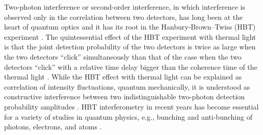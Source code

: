 \documentclass[aps,prl,reprint,showpacs,superscriptaddress]{revtex4-1}
\begin{document}






\maketitle


Two-photon interference or  second-order interference, in which interference is observed only in the correlation between two detectors,  has long been at the heart of quantum optics and it has its root in the Hanbury-Brown--Twiss (HBT) experiment \cite{HBT56a,Glauber63a}. The quintessential effect of the HBT experiment with thermal light is that the joint detection probability of the two detectors is twice as large when the two detectors ``click'' simultaneously  than that of the case when the two detectors ``click'' with a relative time delay bigger than the coherence time of the thermal light \cite{Morgan66,Arecchi66}. While the HBT effect with thermal light can be explained  as correlation of intensity fluctuations, quantum mechanically, it is understood as constructive interference between two indistinguishable two-photon detection probability amplitudes \cite{Fano61}.  HBT interferometry in recent years has become essential for a variety of studies in quantum physics, e.g., bunching and anti-bunching of photons, electrons, and atoms \cite{Grangier86,Henny99,Jeltes07}.
\end{document}
